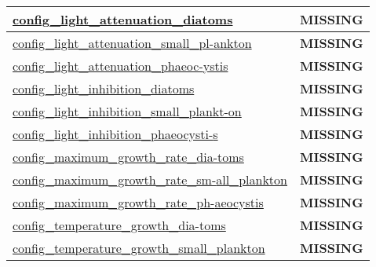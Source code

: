{\begin{center}
\begin{longtable}{| p{2.0in} || p{4.0in} |}
    \hline
    \hyperref[subsec:nm_sec_config_light_attenuation_diatoms]{config\_light\_attenuation\_diatoms} & {\bf \color{red} MISSING} \\
    \hline
    \hyperref[subsec:nm_sec_config_light_attenuation_small_plankton]{config\_light\_attenuation\_small\_pl-}\hyperref[subsec:nm_sec_config_light_attenuation_small_plankton]{ankton}& {\bf \color{red} MISSING} \\
    \hline
    \hyperref[subsec:nm_sec_config_light_attenuation_phaeocystis]{config\_light\_attenuation\_phaeoc-}\hyperref[subsec:nm_sec_config_light_attenuation_phaeocystis]{ystis}& {\bf \color{red} MISSING} \\
    \hline
    \hyperref[subsec:nm_sec_config_light_inhibition_diatoms]{config\_light\_inhibition\_diatoms} & {\bf \color{red} MISSING} \\
    \hline
    \hyperref[subsec:nm_sec_config_light_inhibition_small_plankton]{config\_light\_inhibition\_small\_plankt-}\hyperref[subsec:nm_sec_config_light_inhibition_small_plankton]{on}& {\bf \color{red} MISSING} \\
    \hline
    \hyperref[subsec:nm_sec_config_light_inhibition_phaeocystis]{config\_light\_inhibition\_phaeocysti-}\hyperref[subsec:nm_sec_config_light_inhibition_phaeocystis]{s}& {\bf \color{red} MISSING} \\
    \hline
    \hyperref[subsec:nm_sec_config_maximum_growth_rate_diatoms]{config\_maximum\_growth\_rate\_dia-}\hyperref[subsec:nm_sec_config_maximum_growth_rate_diatoms]{toms}& {\bf \color{red} MISSING} \\
    \hline
    \hyperref[subsec:nm_sec_config_maximum_growth_rate_small_plankton]{config\_maximum\_growth\_rate\_sm-}\hyperref[subsec:nm_sec_config_maximum_growth_rate_small_plankton]{all\_plankton}& {\bf \color{red} MISSING} \\
    \hline
    \hyperref[subsec:nm_sec_config_maximum_growth_rate_phaeocystis]{config\_maximum\_growth\_rate\_ph-}\hyperref[subsec:nm_sec_config_maximum_growth_rate_phaeocystis]{aeocystis}& {\bf \color{red} MISSING} \\
    \hline
    \hyperref[subsec:nm_sec_config_temperature_growth_diatoms]{config\_temperature\_growth\_dia-}\hyperref[subsec:nm_sec_config_temperature_growth_diatoms]{toms}& {\bf \color{red} MISSING} \\
    \hline
    \hyperref[subsec:nm_sec_config_temperature_growth_small_plankton]{config\_temperature\_growth\_small\_plankton} & {\bf \color{red} MISSING} \\
    \hline

\end{longtable}
\end{center}}
